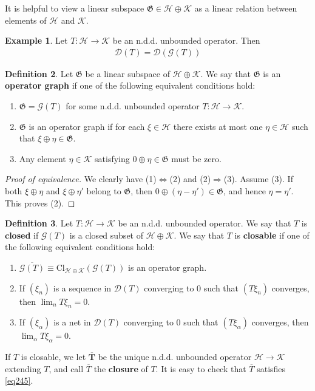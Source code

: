 \documentclass[12pt,b5paper,notitlepage]{article}
\theoremstyle{definition}
\newtheorem{df}{Definition}[subsection]
\newtheorem{eg}[df]{Example}
\theoremstyle{plain}
\newcommand{\fk}{\mathfrak}
\newcommand{\ovl}{\overline}
\newcommand{\Dom}{\mathscr{D}}
\newcommand{\Cl}{\mathrm{Cl}}
\newcommand{\MH}{\mathcal H}
\newcommand{\MK}{\mathcal K}
\newcommand{\SG}{\mathscr G}
\newcommand{\hqed}{\hfill\qedsymbol}
\numberwithin{equation}{section}
\begin{document}
It is helpful to view a linear subspace $\fk G\in\MH\oplus\MK$ as a linear relation between elements of $\MH$ and $\MK$.


\begin{eg}
Let $T:\MH\rightarrow\MK$ be an n.d.d. unbounded operator. Then
\begin{align*}
\Dom(T)=\Dom(\SG(T))
\end{align*}
\end{eg}


\begin{df}\label{lb387}
Let $\fk G$ be a linear subspace of $\MH\oplus\MK$. We say that $\fk G$ is an \textbf{operator graph}  if one of the following equivalent conditions hold:
\begin{enumerate}[label=(\arabic*)]
\item $\fk G=\SG(T)$ for some n.d.d. unbounded operator $T:\MH\rightarrow\MK$.
\item $\fk G$ is an operator graph if for each $\xi\in\MH$ there exists at most one $\eta\in\MH$ such that $\xi\oplus\eta\in\fk G$.
\item Any element $\eta\in\MK$ satisfying $0\oplus\eta\in\fk G$ must be zero.
\end{enumerate} 
\end{df}

\begin{proof}[Proof of equivalence]
We clearly have (1)$\Leftrightarrow$(2) and (2)$\Rightarrow$(3). Assume (3). If both $\xi\oplus\eta$ and $\xi\oplus\eta'$ belong to $\fk G$, then $0\oplus(\eta-\eta')\in\fk G$, and hence $\eta=\eta'$. This proves (2).
\end{proof}




\begin{df}\label{lb480}
Let $T:\MH\rightarrow\MK$ be an n.d.d. unbounded operator. We say that $T$ is \textbf{closed} if $\SG(T)$ is a closed subset of $\MH\oplus\MK$.  We say that $T$ is \textbf{closable} if one of the following equivalent conditions hold:
\begin{enumerate}[label=(\arabic*)]
\item $\ovl{\SG(T)}\equiv\Cl_{\MH\oplus\MK}(\SG(T))$ is an operator graph.
\item If $(\xi_n)$ is a sequence in $\Dom(T)$ converging to $0$ such that $(T\xi_n)$ converges, then $\lim_n T\xi_n=0$.
\item If $(\xi_\alpha)$ is a net in $\Dom(T)$ converging to $0$ such that $(T\xi_\alpha)$ converges, then $\lim_\alpha T\xi_\alpha=0$.
\end{enumerate}  
If $T$ is closable, we let $\pmb{\ovl T}$ be the unique n.d.d. unbounded operator $\MH\rightarrow\MK$ extending $T$, and call $\ovl T$ the \textbf{closure} of $T$.   It is easy to check that $\ovl T$ satisfies \eqref{eq245}. \hqed
\end{df}
\end{document}
